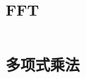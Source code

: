 \documentclass[utf8]{ctexart}
\newcommand{\cpp}[1]{\inputminted[linenos,breaklines,tabsize=4,mathescape]{c++}{#1}}
\begin{document}
\cpp{codes/math/polynomial/lagrange-weight.cpp}

\subsection{FFT}

\cpp{codes/math/polynomial/fft.cpp}

\subsection{多项式乘法}

\cpp{codes/math/polynomial/polynomial-multiply.cpp}




\end{document}

